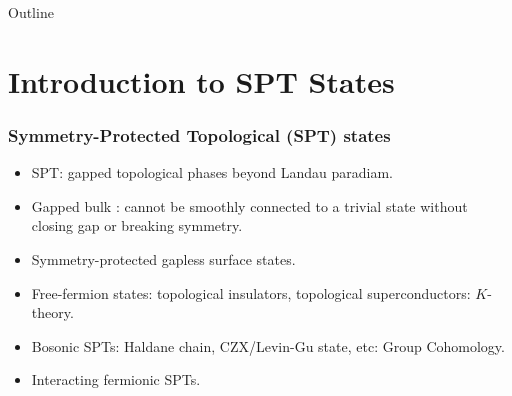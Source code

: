 \documentclass[xcolor=table, 11pt, aspectratio=1610]{beamer}
\begin{document}
\begin{frame}{Outline}
      \tableofcontents
\end{frame}


\section{Introduction to SPT States}

\begin{frame}
  \frametitle{Symmetry-Protected Topological (SPT) states}
\begin{itemize}
\item SPT: gapped topological phases beyond Landau paradiam.
\item Gapped bulk : cannot be smoothly connected to a trivial state without closing gap or breaking symmetry.
\item Symmetry-protected gapless surface states.
\item Free-fermion states: topological insulators, topological superconductors: $K$-theory.
\item Bosonic SPTs: Haldane chain, CZX/Levin-Gu state, etc: Group Cohomology.
\item Interacting fermionic SPTs.
\end{itemize}
\end{frame}
\end{document}
